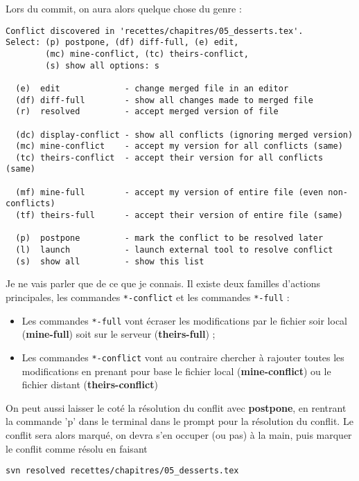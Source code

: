 \documentclass[a4paper,twoside]{article}
\begin{document}
Lors du commit, on aura alors quelque chose du genre :
\begin{verbatim}
Conflict discovered in 'recettes/chapitres/05_desserts.tex'.
Select: (p) postpone, (df) diff-full, (e) edit,
        (mc) mine-conflict, (tc) theirs-conflict,
        (s) show all options: s

  (e)  edit             - change merged file in an editor
  (df) diff-full        - show all changes made to merged file
  (r)  resolved         - accept merged version of file

  (dc) display-conflict - show all conflicts (ignoring merged version)
  (mc) mine-conflict    - accept my version for all conflicts (same)
  (tc) theirs-conflict  - accept their version for all conflicts (same)

  (mf) mine-full        - accept my version of entire file (even non-conflicts)
  (tf) theirs-full      - accept their version of entire file (same)

  (p)  postpone         - mark the conflict to be resolved later
  (l)  launch           - launch external tool to resolve conflict
  (s)  show all         - show this list
\end{verbatim}

Je ne vais parler que de ce que je connais. Il existe deux familles d'actions principales, les commandes \texttt{*-conflict} et les commandes \texttt{*-full} :
\begin{itemize}
\item Les commandes \texttt{*-full} vont écraser les modifications par le fichier soir local (\textbf{mine-full}) soit sur le serveur (\textbf{theirs-full}) ;
\item Les commandes \texttt{*-conflict} vont au contraire chercher à rajouter toutes les modifications en prenant pour base le fichier local (\textbf{mine-conflict}) ou le fichier distant (\textbf{theirs-conflict})
\end{itemize}

\bigskip

On peut aussi laisser le coté la résolution du conflit avec \textbf{postpone}, en rentrant la commande 'p' dans le terminal dans le prompt pour la résolution du conflit. Le conflit sera alors marqué, on devra s'en occuper (ou pas) à la main, puis marquer le conflit comme résolu en faisant
\begin{verbatim}
svn resolved recettes/chapitres/05_desserts.tex
\end{verbatim}



\printindex
\end{document}
